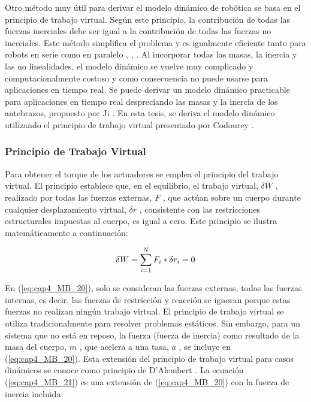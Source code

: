         Otro método muy útil para derivar el modelo dinámico de robótica se basa en el principio de trabajo virtual. Según este principio, la contribución de todas las fuerzas inerciales debe ser igual a la contribución de todas las fuerzas no inerciales. Este método simplifica el problema y es igualmente eficiente tanto para robots en serie como en paralelo \cite{Codourey:31400}, \cite{bodyoriente}, \cite{zhang1993efficient}. Al incorporar todas las masas, la inercia y las no linealidades, el modelo dinámico se vuelve muy complicado y computacionalmente costoso y como consecuencia no puede usarse para aplicaciones en tiempo real. Se puede derivar un modelo dinámico practicable para aplicaciones en tiempo real despreciando las masas y la inercia de los antebrazos, propuesto por Ji \cite{StudyinertiaStewart}. En esta tesis, se deriva el modelo dinámico utilizando el principio de trabajo virtual presentado por Codourey \cite{Codourey_decoupling}.      
        \newpage


        \subsubsection{Principio de Trabajo Virtual}

        Para obtener el torque de los actuadores se emplea el principio del trabajo virtual. El principio establece que, en el equilibrio, el trabajo virtual,  $\delta W$  , realizado por todas las fuerzas externas, $F$ , que actúan sobre un cuerpo durante cualquier desplazamiento virtual,  $\delta r $  , consistente con las restricciones estructurales impuestas al cuerpo, es igual a cero. Este principio se ilustra matemáticamente a continuación:
        
        \begin{equation}
            \delta W= \sum _{i=1}^{N}F_{i} \ast \delta r_{i}=0\\
            \label{eq:cap4_MB_20}
        \end{equation}

        
        En (\ref{eq:cap4_MB_20}), solo se consideran las fuerzas externas, todas las fuerzas internas, es decir, las fuerzas de restricción y reacción se ignoran porque estas fuerzas no realizan ningún trabajo virtual. El principio de trabajo virtual se utiliza tradicionalmente para resolver problemas estáticos. Sin embargo, para un sistema que no está en reposo, la fuerza (fuerza de inercia) como resultado de la masa del cuerpo,  \( m \) , que acelera a una tasa,  \( a \) , se incluye en (\ref{eq:cap4_MB_20}). Esta extensión del principio de trabajo virtual para casos dinámicos se conoce como principio de D'Alembert \cite{}. La ecuación (\ref{eq:cap4_MB_21}) es una extensión de  (\ref{eq:cap4_MB_20}) con la fuerza de inercia incluida:
        
